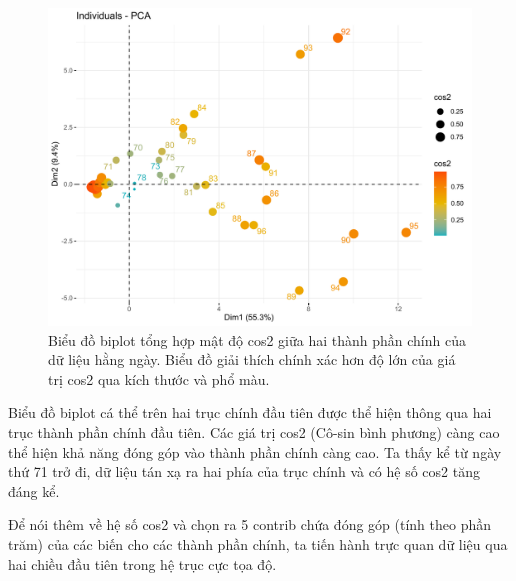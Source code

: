 \documentclass[../thesis.tex]{subfiles}
\begin{document}
\begin{figure}[H]
	\centering
	\includegraphics[width=0.7 \linewidth]{images/ind_case}
	\caption[Biểu đồ biplot tổng hợp mật độ cos2 giữa hai thành phần chính của dữ liệu hằng ngày]{Biểu đồ biplot tổng hợp mật độ cos2 giữa hai thành phần chính của dữ liệu hằng ngày. Biểu đồ giải thích chính xác hơn độ lớn của giá trị cos2 qua kích thước và phổ màu.}
	\label{fig:indcase}
\end{figure}

Biểu đồ biplot cá thể trên hai trục chính đầu tiên được thể hiện thông qua hai trục thành phần chính đầu tiên. Các giá trị cos2 (Cô-sin bình phương) càng cao thể hiện khả năng đóng góp vào thành phần chính càng cao. Ta thấy kể từ ngày thứ 71 trở đi, dữ liệu tán xạ ra hai phía của trục chính và có hệ số cos2 tăng đáng kể.

Để nói thêm về hệ số cos2 và chọn ra 5 contrib chứa đóng góp (tính theo phần trăm) của các biến cho các thành phần chính, ta tiến hành trực quan dữ liệu qua hai chiều đầu tiên trong hệ trục cực tọa độ.
\end{document}
